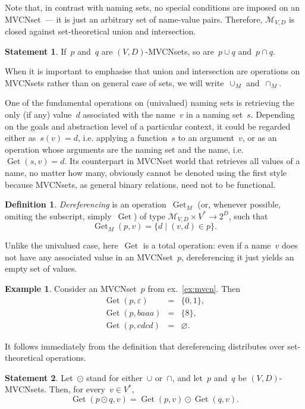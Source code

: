 \documentclass{article}
\theoremstyle{definition}
\newtheorem{Df}{Definition}
\newtheorem{St}{Statement}
\newtheorem{Ex}{Example}
\newcommand{\setcharmvcn}{M}
\newcommand{\setsymbol}[3]{\mathcal{#1}_{#2,#3}}
\newcommand{\setmvcn}[2]{\setsymbol{\setcharmvcn}{#1}{#2}}
\newcommand{\deref}{\operatorname{Get}}
\begin{document}
Note that, in contrast with naming sets, no special conditions are imposed
on an MVCNset~--- it is just an arbitrary set of name-value pairs.
Therefore, $\setmvcn{V}{D}$ is closed against set-theoretical union
and intersection.
\begin{St}\label{st:mvcn-setop}
If~$p$ and~$q$ are $(V,D)$-MVCNsets, so are~$p\cup q$ and~$p\cap q$.
\end{St}

When it is important to emphasise that union and intersection are operations
on MVCNsets rather than on general case of sets, we will
write~$\cup_\setcharmvcn$ and~$\cap_\setcharmvcn$.

One of the fundamental operations on (univalued) naming sets is retrieving
the only (if any) value~$d$ associated with the name~$v$ in a naming
set~$s$.  Depending on the goals and abstraction level of a particular
context, it could be regarded either as~$s(v)=d$, i.e. applying a function~$s$
to an argument~$v$, or as an operation whose arguments are the naming set and
the name, i.e.~$\deref(s, v)=d$. Its counterpart in MVCNset world that
retrieves all values of a name, no matter how many, obviously cannot be denoted
using the first style because MVCNsets, as general binary relations, need not
to be functional.

\begin{Df}\label{df:mvcn-dereferencing}
\emph{Dereferencing} is an operation~$\deref_\setcharmvcn$ (or, whenever
possible, omiting the subscript, simply~$\deref$) of type
$\setmvcn{V}{D} \times V^\ast \to 2^D$,
such that
\[
  \deref_\setcharmvcn(p, v) = \{ d \mid (v, d) \in p \} .
\]
\end{Df}

Unlike the univalued case, here~$\deref$ is a total operation: even if a
name~$v$ does not have any associated value in an MVCNset~$p$, dereferencing
it just yields an empty set of values.

\begin{Ex}\label{ex:mvcn-dereferencing}
Consider an MVCNset~$p$ from ex.~\ref{ex:mvcn}. Then
\begin{eqnarray*}
  \deref(p, \varepsilon) & = & \{ 0, 1 \}, \\
  \deref(p, baaa)        & = & \{ 8 \}, \\
  \deref(p, cdcd)        & = & \varnothing .
\end{eqnarray*}

\end{Ex}

It follows immediately from the definition that dereferencing distributes
over set-theoretical operations.
\begin{St}\label{st:mvcn-deref-distributivity}
Let~$\odot$ stand for either~$\cup$ or~$\cap$, and let~$p$ and~$q$ be
$(V,D)$-MVCNsets. Then, for every~$v\in V^\ast$,
\[
  \deref(p\odot q, v) = \deref(p, v) \odot \deref(q, v) .
\]
\end{St}
\end{document}
